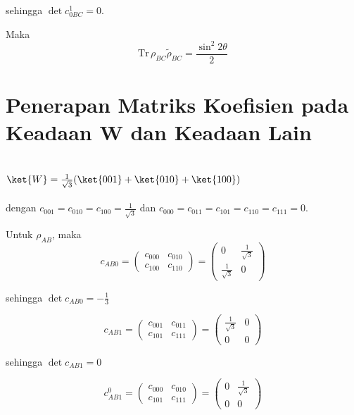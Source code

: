 sehingga $\det c_{0BC}^1 = 0$.

Maka
\begin{equation}
	\mathrm{Tr}\,\rho_{BC}\tilde{\rho}_{BC}=\frac{\sin^2 2\theta}{2}
\end{equation}

\section{Penerapan Matriks Koefisien pada Keadaan W dan Keadaan Lain}
\subsection{ $\ket{W}=\frac{1}{\sqrt{3}}(\ket{001}+\ket{010}+\ket{100})$}
dengan $c_{001}=c_{010}=c_{100}=\frac{1}{\sqrt{3}}$ dan $c_{000}=c_{011}=c_{101}=c_{110}=c_{111}=0$.

Untuk $\rho_{AB}$, maka
\begin{equation}
	c_{AB0}=
	\begin{pmatrix}
		c_{000} & c_{010} \\
		c_{100} & c_{110}
	\end{pmatrix}=
	\begin{pmatrix}
		0 & \frac{1}{\sqrt{3}} \\
		\frac{1}{\sqrt{3}} & 0
	\end{pmatrix}
\end{equation}

sehingga $\det c_{AB0} = -\frac{1}{3}$

\begin{equation}
	c_{AB1}=
	\begin{pmatrix}
		c_{001} & c_{011} \\
		c_{101} & c_{111}
	\end{pmatrix}=
	\begin{pmatrix}
		\frac{1}{\sqrt{3}} & 0 \\
		0 & 0
	\end{pmatrix}
\end{equation}

sehingga $\det c_{AB1} = 0$

\begin{equation}
	c_{AB1}^0=
	\begin{pmatrix}
		c_{000} & c_{010} \\
		c_{101} & c_{111}
	\end{pmatrix}=
	\begin{pmatrix}
		0 & \frac{1}{\sqrt{3}} \\
		0 & 0
	\end{pmatrix}
\end{equation}

